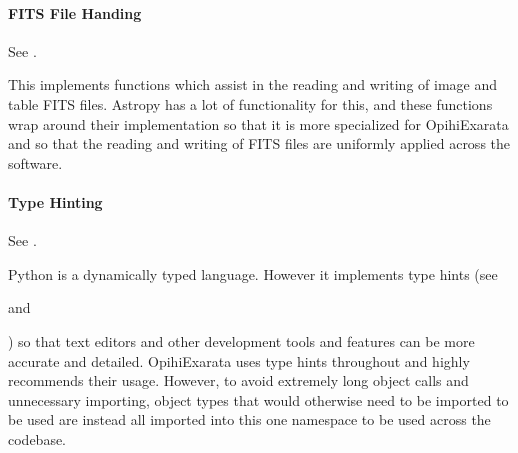 \documentclass[letterpaper,11pt,english]{sphinxmanual}
\begin{document}
\paragraph{FITS File Handing}
\label{\detokenize{technical/architecture/library:fits-file-handing}}
\sphinxAtStartPar
See {\hyperref[\detokenize{code/opihiexarata.library.fits:module-opihiexarata.library.fits}]{}}.

\sphinxAtStartPar
This implements functions which assist in the reading and writing of image and
table FITS files. Astropy has a lot of functionality for this, and these
functions wrap around their implementation so that it is more specialized for
OpihiExarata and so that the reading and writing of FITS files are uniformly
applied across the software.


\paragraph{Type Hinting}
\label{\detokenize{technical/architecture/library:type-hinting}}\label{\detokenize{technical/architecture/library:technical-architecture-library-hint}}
\sphinxAtStartPar
See {\hyperref[\detokenize{code/opihiexarata.library.hint:module-opihiexarata.library.hint}]{}}.

\sphinxAtStartPar
Python is a dynamically typed language. However it implements type hints
(see %
\begin{footnote}[53]\sphinxAtStartFootnote
{}
%
\end{footnote} and %
\begin{footnote}[54]\sphinxAtStartFootnote
{}
%
\end{footnote}) so that text editors and other development
tools and features can be more accurate and detailed. OpihiExarata uses type
hints throughout and highly recommends their usage. However, to avoid
extremely long object calls and unnecessary importing, object types that
would otherwise need to be imported to be used are instead all imported into
this one namespace to be used across the codebase.
\end{document}
